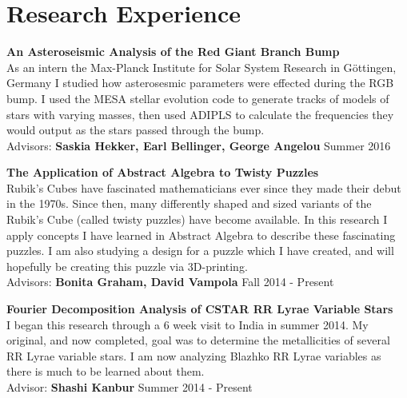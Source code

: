\documentclass[8pt]{article}
\renewenvironment{itemize}{
  \begin{list}{}{
    \setlength{\leftmargin}{1.5em}
  }
}{
  \end{list}
}
\begin{document}
\section*{Research Experience}
\begin{itemize}

\item \textbf{An Asteroseismic Analysis of the Red Giant Branch Bump}\\
As an intern the Max-Planck Institute for Solar System Research in G{\"o}ttingen, Germany I studied how asterosesmic parameters were effected during the RGB bump. I used the MESA
stellar evolution code to generate tracks of models of stars with varying masses, then used ADIPLS to calculate the frequencies they would output as the stars passed through the
bump.\\
Advisors: \textbf{Saskia Hekker, Earl Bellinger, George Angelou} \hfill Summer 2016

\item \textbf{The Application of Abstract Algebra to Twisty Puzzles}\\
Rubik's Cubes have fascinated mathematicians ever since they made their debut in the 1970s. Since then, many differently shaped and sized variants of the Rubik's Cube (called twisty puzzles) have become available. In this research I apply concepts I have learned in Abstract Algebra to describe these fascinating puzzles. I am also studying a design for a puzzle which I have created, and will hopefully be creating this puzzle via 3D-printing.\\
Advisors: \textbf{Bonita Graham, David Vampola} \hfill Fall 2014 - Present

\item \textbf{Fourier Decomposition Analysis of CSTAR RR Lyrae Variable Stars}\\
I began this research through a 6 week visit to India in summer 2014. My original, and now completed, goal was to determine the metallicities of several RR Lyrae variable stars. I am now analyzing Blazhko RR Lyrae variables as there is much to be learned about them.\\
Advisor: \textbf{Shashi Kanbur} \hfill Summer 2014 - Present

\end{itemize}
\end{document}
